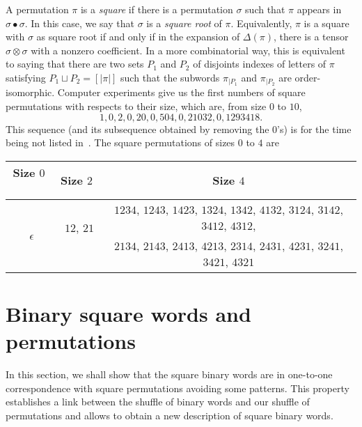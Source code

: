 \documentclass[a4paper]{llncs}
\DeclareMathOperator{\SHUFFLE}{\bullet}
\begin{document}
A permutation $\pi$ is a {\em square} if there is a permutation
$\sigma$ such that $\pi$ appears in $\sigma \SHUFFLE \sigma$.
In this case, we say that $\sigma$ is a {\em square root} of $\pi$.
Equivalently, $\pi$ is a square with $\sigma$ as square root if and only
if in the expansion of $\Delta(\pi)$, there is a tensor
$\sigma \otimes \sigma$ with a nonzero coefficient. In a more
combinatorial way, this is equivalent to saying that there are two sets
$P_1$ and $P_2$ of disjoints indexes of letters of $\pi$ satisfying
$P_1 \sqcup P_2 = [|\pi|]$ such that the subwords $\pi_{|P_1}$ and
$\pi_{|P_2}$ are order-isomorphic. Computer experiments give us the
first numbers of square permutations with respects to their size, which
are, from size $0$ to $10$,
\begin{equation}
    1, 0, 2, 0, 20, 0, 504, 0, 21032, 0, 1293418.
\end{equation}
This sequence (and its subsequence obtained by removing the $0$'s) is for
the time being not listed in~\cite{Slo}. The square permutations of
sizes $0$ to $4$ are
\smallskip

\begin{tabular}{c|c|c}
    Size $0$ \, & Size $2$ & Size $4$ \\ \hline
    \multirow{2}{*}{\, $\epsilon$} &
    \multirow{2}{*}{\, $12$, $21$ \,} &
    $1234$, $1243$, $1423$, $1324$, $1342$, $4132$, $3124$, $3142$,
    $3412$, $4312$, \\
    & & $2134$, $2143$, $2413$, $4213$, $2314$, $2431$, $4231$, $3241$,
    $3421$, $4321$
\end{tabular}


\section{Binary square words and permutations}
\label{section:Binary square words and permutations}
In this section, we shall show that the square binary words are in
one-to-one correspondence with square permutations avoiding some
patterns. This property establishes a link between the shuffle of binary
words and our shuffle of permutations and allows to obtain a new
description of square binary words.
\end{document}
